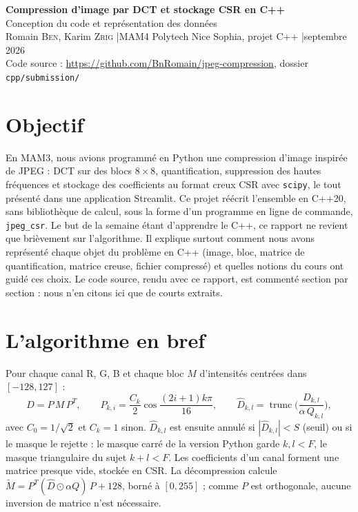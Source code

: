 \documentclass[10pt,a4paper]{article}
\newcommand{\code}[1]{\texttt{#1}}
\begin{document}
\begin{center}
  {\Large\bfseries\color{accent} Compression d'image par DCT et stockage CSR en C++}\\[2pt]
  {\large Conception du code et représentation des données}\\[3pt]
  Romain \textsc{Ben}, Karim \textsc{Zrig} \quad|\quad MAM4 Polytech Nice Sophia, projet C++ \quad|\quad septembre 2026\\[1pt]
  {\small Code source : \url{https://github.com/BnRomain/jpeg-compression}, dossier \code{cpp/submission/}}
\end{center}

\section{Objectif}
En MAM3, nous avions programmé en Python une compression d'image inspirée de JPEG : DCT sur
des blocs $8\times8$, quantification, suppression des hautes fréquences et stockage des
coefficients au format creux CSR avec \code{scipy}, le tout présenté dans une application
Streamlit. Ce projet réécrit l'ensemble en C++20, sans bibliothèque de calcul, sous la forme
d'un programme en ligne de commande, \code{jpeg\_csr}. Le but de la semaine étant d'apprendre
le C++, ce rapport ne revient que brièvement sur l'algorithme. Il explique surtout comment nous
avons représenté chaque objet du problème en C++ (image, bloc, matrice de quantification,
matrice creuse, fichier compressé) et quelles notions du cours ont guidé ces choix. Le code
source, rendu avec ce rapport, est commenté section par section : nous n'en citons ici que de
courts extraits.

\section{L'algorithme en bref}
Pour chaque canal R, G, B et chaque bloc $M$ d'intensités centrées dans $[-128,127]$ :
\[
  D = P\,M\,P^{T}, \qquad P_{k,i} = \frac{C_k}{2}\cos\frac{(2i+1)k\pi}{16}, \qquad
  \hat D_{k,l} = \operatorname{trunc}\!\Big(\frac{D_{k,l}}{\alpha\,Q_{k,l}}\Big),
\]
avec $C_0 = 1/\sqrt{2}$ et $C_k = 1$ sinon. $\hat D_{k,l}$ est ensuite annulé si
$|\hat D_{k,l}| < S$ (seuil) ou si le masque le rejette : le masque carré de la version Python
garde $k,l < F$, le masque triangulaire du sujet $k+l < F$. Les coefficients d'un canal forment
une matrice presque vide, stockée en CSR. La décompression calcule
$\tilde M = P^{T}(\hat D \odot \alpha Q)\,P + 128$, borné à $[0,255]$ ; comme $P$ est
orthogonale, aucune inversion de matrice n'est nécessaire.
\end{document}
